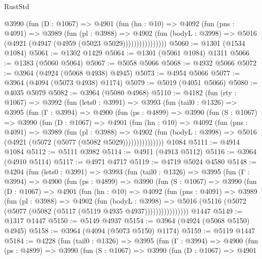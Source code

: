 \begin{lexlean}{RustStd}
\begin{coremodule}
                @3990
                  (fun (D : @1067) =>
                  @4901
                    (fun (hn : @10) =>
                    @4092
                      (fun (pns : @4091) =>
                      @3989
                        (fun (pl : @3988) =>
                        @4902
                          (fun (bodyL : @3998) =>
                          @5016 (@4921 (@4947 (@4959 (@5023 @5029))))))))))))))))
@5060 := @1301 (@1534 @1084)
@5061 := @1302 @1429
@5064 := @1301 (@5061 @1084) @1311
@5066 := @1383 (@5060 @5064)
@5067 := @5058 @5066
@5068 := @4932 @5066
@5072 := @3964 (@4924 (@5068 @4938) @4945)
@5073 := @4954 @5066
@5077 := @3964 (@4094 (@5073 @4938) @1174)
@5079 := @5019 (@4051 @5066)
@5080 := @4035 @5079
@5082 := @3964 (@5080 @4968)
@5110 := @4182
    (fun (rty : @1067) =>
    @3992
      (fun (lets0 : @3991) =>
      @3993
        (fun (tail0 : @1326) =>
        @3995
          (fun (Γ : @3994) =>
          @4900
            (fun (ps : @4899) =>
            @3990
              (fun (S : @1067) =>
              @3990
                (fun (D : @1067) =>
                @4901
                  (fun (hn : @10) =>
                  @4092
                    (fun (pns : @4091) =>
                    @3989
                      (fun (pl : @3988) =>
                      @4902
                        (fun (bodyL : @3998) =>
                        @5016 (@4921 (@5072 (@5077 (@5082 @5029)))))))))))))))
    @1084
@5111 := @4914 @1084
@5112 := @5111 @3982
@5114 := @4911 (@4913 @5112)
@5116 := @3964 (@4910 @5114)
@5117 := @4971 @4717
@5119 := @4719 @5024 @4580
@5148 := @4204
    (fun (lets0 : @3991) =>
    @3993
      (fun (tail0 : @1326) =>
      @3995
        (fun (Γ : @3994) =>
        @4900
          (fun (ps : @4899) =>
          @3990
            (fun (S : @1067) =>
            @3990
              (fun (D : @1067) =>
              @4901
                (fun (hn : @10) =>
                @4092
                  (fun (pns : @4091) =>
                  @3989
                    (fun (pl : @3988) =>
                    @4902
                      (fun (bodyL : @3998) =>
                      @5016 (@5116 (@5072 (@5077 (@5082 (@5117 (@5119 @4935 @4937))))))))))))))))
    @1447
@5149 := @1317 @1447
@5150 := @5149 @4937
@5154 := @3964 (@4924 (@5068 @5150) @4945)
@5158 := @3964 (@4094 (@5073 @5150) @1174)
@5159 := @5119 @1447
@5184 := @4228
    (fun (tail0 : @1326) =>
    @3995
      (fun (Γ : @3994) =>
      @4900
        (fun (ps : @4899) =>
        @3990
          (fun (S : @1067) =>
          @3990
            (fun (D : @1067) =>
            @4901

\end{coremodule}
\end{lexlean}
